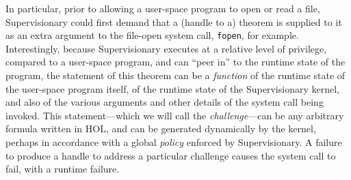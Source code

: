 \documentclass[a4paper, UKenglish, cleveref, autoref, thm-restate, colorlinks]{lipics-v2021}
\begin{document}
In particular, prior to allowing a user-space program to open or read a file, Supervisionary could first demand that a (handle to a) theorem is supplied to it as an extra argument to the file-open system call, \texttt{fopen}, for example.
Interestingly, because Supervisionary executes at a relative level of privilege, compared to a user-space program, and can ``peer in'' to the runtime state of the program, the statement of this theorem can be a \emph{function} of the runtime state of the user-space program itself, of the runtime state of the Supervisionary kernel, and also of the various arguments and other details of the system call being invoked.
This statement---which we will call the \emph{challenge}---can be any arbitrary formula written in HOL, and can be generated dynamically by the kernel, perhaps in accordance with a global \emph{policy} enforced by Supervisionary.
A failure to produce a handle to address a particular challenge causes the system call to fail, with a runtime failure.
\end{document}
